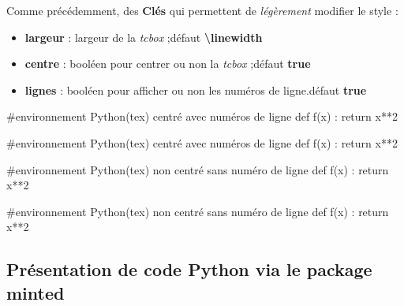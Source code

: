 \documentclass{article}
\newcommand\Cle[1]{{\bfseries\sffamily\textlangle #1\textrangle}}
\begin{document}
\begin{codecles}
Comme précédemment, des \Cle{Clés} qui permettent de \textit{légèrement} modifier le style :

\begin{itemize}
	\item \Cle{largeur} : largeur de la \textit{tcbox} ;\hfill{}défaut \Cle{\textbackslash linewidth}
	\item \Cle{centre} : booléen pour centrer ou non la \textit{tcbox} ;\hfill{}défaut \Cle{true}
	\item \Cle{lignes} : booléen pour afficher ou non les numéros de ligne.\hfill{}défaut \Cle{true}
\end{itemize}
\end{codecles}

\begin{codetex}
\begin{envcodepythontex}[largeur=12cm]
	#environnement Python(tex) centré avec numéros de ligne
	def f(x) :
		return x**2
\end{envcodepythontex}
\end{codetex}

\begin{codesortie}
\begin{envcodepythontex}[largeur=12cm]
	#environnement Python(tex) centré avec numéros de ligne
	def f(x) :
		return x**2
\end{envcodepythontex}
\end{codesortie}

\begin{codetex}
\begin{envcodepythontex}[largeur=12cm,lignes=false,centre=false]
	#environnement Python(tex) non centré sans numéro de ligne
	def f(x) :
		return x**2
\end{envcodepythontex}
\end{codetex}

\begin{codesortie}
\begin{envcodepythontex}[largeur=12cm,lignes=false,centre=false]
	#environnement Python(tex) non centré sans numéro de ligne
	def f(x) :
		return x**2
\end{envcodepythontex}
\end{codesortie}

\subsection{Présentation de code Python via le package minted}\label{pytminted}
\end{document}

